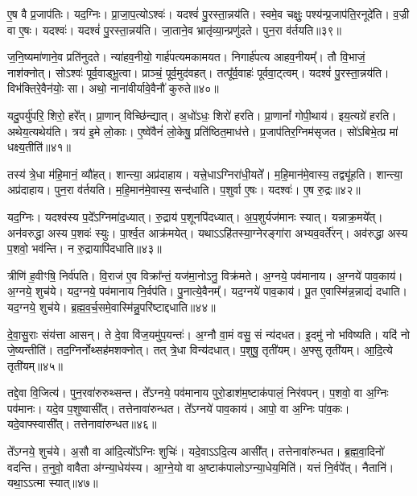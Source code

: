 ए॒ष वै प्र॒जा\-प॑तिः।
यद॒ग्निः।
प्रा॒जा॒प॒त्यो\-ऽश्वः॑।
यदश्वं॑ पु॒रस्ता॒न्नय॑ति।
स्वमे॒व चक्षुः॒ पश्य॑न्प्र॒जा\-प॑ति॒रनूदे॑ति।
व॒ज्री वा ए॒षः।
यदश्वः॑।
यदश्वं॑ पु॒रस्ता॒न्नय॑ति।
जा॒ताने॒व भ्रातृ॑व्या॒न्प्रणु॑दते।
पुन॒रा व॑र्तयति॥३९॥

ज॒नि॒ष्यमा॑णाने॒व प्रति॑\-नुदते।
न्या॑हव॒नीयो॒ गार्\mbox{}ह॑पत्य\-मकामयत।
निगार्\mbox{}ह॑पत्य आहव॒नीयम्᳚।
तौ वि॒भाजं॒ नाश॑क्नोत्।
सोऽश्वः॑ पूर्व॒वाड्भू॒त्वा।
प्राञ्चं॒ पूर्व॒मुद॑वहत्।
तत्पू᳚र्व॒वाहः॑ पूर्ववा॒ट्त्वम्।
यदश्वं॑ पु॒रस्ता॒न्नय॑ति।
विभ॑क्ति\-रे॒वैन॑योः॒ सा।
अथो॒ नाना॑वीर्यावे॒वैनौ॑ कुरुते॥४०॥

यदु॒पर्यु॑परि॒ शिरो॒ हरे᳚त्।
प्रा॒णान्‌ वि\-च्छि॑न्द्यात्।
अ॒धो॑ऽधः॒ शिरो॑ हरति।
प्रा॒णानां᳚ गोपी॒थाय॑।
इय॒त्यग्रे॑ हरति।
अथेय॒त्यथेय॑ति।
त्रय॑ इ॒मे लो॒काः।
ए॒ष्वे॑वैनं॑ लो॒केषु॒ प्रति॑\-ष्ठित॒माध॑त्ते।
प्र॒जा\-प॑तिर॒ग्निम॑\-सृजत।
सो॑ऽबिभे॒त्प्र मा॑ धक्ष्य॒तीति॑॥४१॥

तस्य॑ त्रे॒धा म॑हि॒मानं॒ व्यौ॑हत्।
शान्त्या॒ अप्र॑दाहाय।
यत्त्रे॒धा\-ऽग्निरा॑धी॒यते᳚।
म॒हि॒मान॑मे॒वास्य॒ तद्व्यू॑हति।
शान्त्या॒ अप्र॑दाहाय।
पुन॒रा व॑र्तयति।
म॒हि॒मान॑मे॒वास्य॒ सन्द॑धाति।
प॒शुर्वा ए॒षः।
यदश्वः॑।
ए॒ष रु॒द्रः॥४२॥

यद॒ग्निः।
यदश्व॑स्य प॒दे᳚\-ऽग्निमा॑द॒ध्यात्।
रु॒द्राय॑ प॒शूनपि॑\-दध्यात्।
अ॒प॒शुर्यज॑मानः स्यात्।
यन्नाक्र॒मये᳚त्।
अन॑वरुद्धा अस्य प॒शवः॑ स्युः।
पा॒र्श्व॒त आक्र॑मयेत्।
यथाऽऽहि॑तस्या॒ग्नेरङ्गा॑रा अभ्यव॒वर्ते॑रन्।
अव॑रुद्धा अस्य प॒शवो॒ भव॑न्ति।
न रु॒द्रायापि॑दधाति॥४३॥

त्रीणि॑ ह॒वीꣳषि॒ निर्व॑पति।
वि॒राज॑ ए॒व विक्रा᳚न्तं॒ यज॑मा॒नोऽनु॒ विक्र॑मते।
अ॒ग्नये॒ पव॑मानाय।
अ॒ग्नये॑ पाव॒काय॑।
अ॒ग्नये॒ शुच॑ये।
यद॒ग्नये॒ पव॑मानाय नि॒र्वप॑ति।
पु॒नात्ये॒वैनम्᳚।
यद॒ग्नये॑ पाव॒काय॑।
पू॒त ए॒वास्मि॑न्न॒न्नाद्यं॑ दधाति।
यद॒ग्नये॒ शुच॑ये।
ब्र॒ह्म॒व॒र्च॒समे॒वास्मि॑न्नु॒परि॑ष्टाद्दधाति॥४४॥\anuvakamend[ए॒न॒मा॒ह॒व॒नीयं॑ धत्ते\-ऽश्व॒त्वं व॑र्तयति कुरुत॒ इति॑ रु॒द्रो द॑धाति॒ यद॒ग्नये॒ शुच॑य॒ एकं॑ च]

दे॒वा॒सु॒राः संय॑त्ता आसन्।
ते दे॒वा वि॑ज॒यमु॑प॒यन्तः॑।
अ॒ग्नौ वा॒मं वसु॒ सं न्य॑दधत।
इ॒दमु॑ नो भविष्यति।
यदि॑ नो जे॒ष्यन्तीति॑।
तद॒ग्निर्नोथ्सह॑मशक्नोत्।
तत् त्रे॒धा विन्य॑दधात्।
प॒शुषु॒ तृती॑यम्।
अ॒फ्सु तृती॑यम्।
आ॒दि॒त्ये तृती॑यम्॥४५॥

तद्दे॒वा वि॒जित्य॑।
पुन॒रवा॑रुरुथ्सन्त।
ते᳚ऽग्नये॒ पव॑मानाय पुरो॒डाश॑म॒ष्टा\-क॑पालं॒ निर॑वपन्।
प॒शवो॒ वा अ॒ग्निः पव॑मानः।
यदे॒व प॒शुष्वासी᳚त्।
तत्तेनावा॑रुन्धत।
ते᳚ऽग्नये॑ पाव॒काय॑।
आपो॒ वा अ॒ग्निः पा॑व॒कः।
यदे॒वाफ्स्वासी᳚त्।
तत्तेनावा॑रुन्धत॥४६॥

ते᳚ऽग्नये॒ शुच॑ये।
अ॒सौ वा आ॑दि॒त्यो᳚\-ऽग्निः शुचिः॑।
यदे॒वाऽऽदि॒त्य आसी᳚त्।
तत्तेनावा॑रुन्धत।
ब्र॒ह्म॒वा॒दिनो॑ वदन्ति।
त॒नुवो॒ वावैता अ॑ग्न्या॒धेय॑स्य।
आ॒ग्ने॒यो वा अ॒ष्टा\-क॑पालो\-ऽग्न्या॒धेय॒मिति॑।
यत्तं नि॒र्वपे᳚त्।
नैतानि॑।
यथा॒ऽऽत्मा स्यात्॥४७॥

